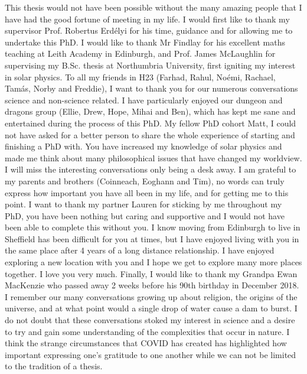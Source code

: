 \begin{acknowledgementslong}
This thesis would not have been possible without the many amazing people that I have had the good fortune of meeting in my life. I would first like to thank my supervisor Prof. Robertus Erd\'elyi for his time, guidance and for allowing me to undertake this PhD. I would like to thank Mr Findlay for his excellent maths teaching at Leith Academy in Edinburgh,  and Prof. James McLaughlin for supervising my B.Sc. thesis at Northumbria University, first igniting my interest in solar physics. \np
%
To all my friends in H23 (Farhad, Rahul, No\'emi, Rachael, Tam\'as, Norby and Freddie), I want to thank you for our numerous conversations science and non-science related. I have particularly enjoyed our dungeon and dragons group (Ellie, Drew, Hope, Mihai and Ben), which has kept me sane and entertained during the process of this PhD. My fellow PhD cohort Matt, I could not have asked for a better person to share the whole experience of starting and finishing a PhD with. You have increased my knowledge of solar physics and made me think about many philosophical issues that have changed my worldview. I will miss the interesting conversations only being a desk away. \np
%
I am grateful to my parents and brothers (Coinneach, Eoghann and Tim), no words can truly express how important you have all been in my life, and for getting me to this point. I want to thank my partner Lauren for sticking by me throughout my PhD, you have been nothing but caring and supportive and I would not have been able to complete this without you. I know moving from Edinburgh to live in Sheffield has been difficult for you at times, but I have enjoyed living with you in the same place after 4 years of a long distance relationship. I have enjoyed exploring a new location with you and I hope we get to explore many more places together. I love you very much.\np
%
Finally, I would like to thank my Grandpa Ewan MacKenzie who passed away 2 weeks before his 90th birthday in December 2018. I remember our many conversations growing up about religion, the origins of the universe, and at what point would a single drop of water cause a dam to burst. I do not doubt that these conversations stoked my interest in science and a desire to try and gain some understanding of the complexities that occur in nature. I think the strange circumstances that COVID has created has highlighted how important expressing one's gratitude to one another while we can not be limited to the tradition of a thesis.
\end{acknowledgementslong}